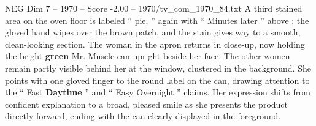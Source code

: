 \begin{textsample}{NEG Dim 7 – 1970 – Score -2.00 – 1970/tv\_com\_1970\_84.txt}
A third stained area on the oven floor is labeled “ pie, ” again with “ Minutes later ” above ; the gloved hand wipes over the brown patch, and the stain gives way to a smooth, clean-looking section.
The woman in the apron returns in close-up, now holding the bright \textbf{green} Mr.
Muscle can upright beside her face.
The other women remain partly visible behind her at the window, clustered in the background.
She points with one gloved finger to the round label on the can, drawing attention to the “ Fast \textbf{Daytime} ” and “ Easy Overnight ” claims.
Her expression shifts from confident explanation to a broad, pleased smile as she presents the product directly forward, ending with the can clearly displayed in the foreground.

\end{textsample}

